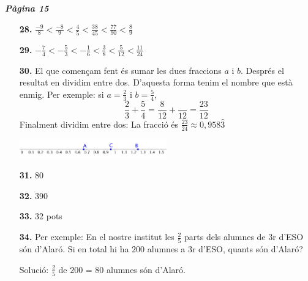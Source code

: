 \documentclass[a4paper, pdf, twoside]{book}
\begin{document}
\begin{multicols}{2}
{\textbf{\em Pàgina 15}} \hrulefill
\begin{enumerate}
\vspace{0.25cm}
\item[\fontfamily{phv}\selectfont\color{blue}\textbf{28. }] 
$\frac {-9}{8}< \frac {-8}{9}<\frac {4}{5} <\frac {38}{45} <\frac {77}{90} < \frac {8}{9}$
 \end{enumerate}
\begin{enumerate}
\vspace{0.25cm}
\item[\fontfamily{phv}\selectfont\color{blue}\textbf{29. }] 
$-\frac {7}{4}<-\frac {5}{3}<-\frac {1}{6}<\frac {3}{8}<\frac {5}{12}<\frac {11}{24}$
\vspace{0.25cm}
\item[\fontfamily{phv}\selectfont\color{blue}\textbf{30. }] 
El que començam fent és sumar les dues fraccions $a$ i $b$. Després el resultat en dividim entre dos. D'aquesta forma tenim el nombre que està enmig. Per exemple: si $a=\frac {2}{3}$ i $b=\frac {5}{4}$, \[\frac {2}{3} +\frac {5}{4} =\frac {8}{12} + \frac {}{12} = \frac {23}{12} \] Finalment dividim entre dos: La fracció és $ \frac {23}{24} \approx 0,958\hat {3}$ \par \includegraphics [width=0.5\textwidth ]{img-sol/t1-recta4} 
\vspace{0.25cm}
\item[\fontfamily{phv}\selectfont\color{blue}\textbf{31. }] 
80
\vspace{0.25cm}
\item[\fontfamily{phv}\selectfont\color{blue}\textbf{32. }] 
390
\vspace{0.25cm}
\item[\fontfamily{phv}\selectfont\color{blue}\textbf{33. }] 
32 pots
\vspace{0.25cm}
\item[\fontfamily{phv}\selectfont\color{blue}\textbf{34. }] 
Per exemple: En el nostre institut les $\frac {2}{5}$ parts dels alumnes de 3r d'ESO són d'Alaró. Si en total hi ha $200$ alumnes a 3r d'ESO, quants són d'Alaró?\par \par Solució: $\frac {2}{5}$ de $200$ = 80 alumnes són d'Alaró.
 \end{enumerate}
\vspace{0.3cm}



\end{multicols}
\end{document}
